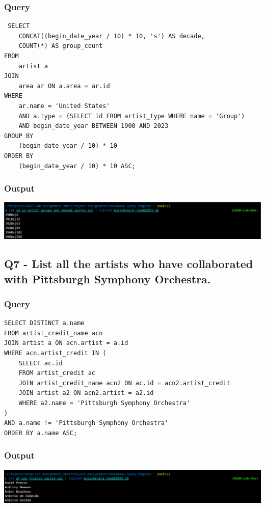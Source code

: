 \documentclass[11pt]{article}
\begin{document}
\subsubsection{Query}
\label{sec:org03e9635}
\begin{verbatim}
 SELECT
    CONCAT((begin_date_year / 10) * 10, 's') AS decade,
    COUNT(*) AS group_count
FROM
    artist a
JOIN
    area ar ON a.area = ar.id
WHERE
    ar.name = 'United States'
    AND a.type = (SELECT id FROM artist_type WHERE name = 'Group')
    AND begin_date_year BETWEEN 1900 AND 2023
GROUP BY
    (begin_date_year / 10) * 10
ORDER BY
    (begin_date_year / 10) * 10 ASC;
\end{verbatim}
\subsubsection{Output}
\label{sec:orge022a35}
\begin{center}
\includegraphics[width=.9\linewidth]{./images/Q6.png}
\end{center}
\subsection{Q7 - List all the artists who have collaborated with Pittsburgh Symphony Orchestra.}
\label{sec:org3d739ce}
\subsubsection{Query}
\label{sec:org730325a}
\begin{verbatim}
SELECT DISTINCT a.name
FROM artist_credit_name acn
JOIN artist a ON acn.artist = a.id
WHERE acn.artist_credit IN (
    SELECT ac.id
    FROM artist_credit ac
    JOIN artist_credit_name acn2 ON ac.id = acn2.artist_credit
    JOIN artist a2 ON acn2.artist = a2.id
    WHERE a2.name = 'Pittsburgh Symphony Orchestra'
)
AND a.name != 'Pittsburgh Symphony Orchestra'
ORDER BY a.name ASC;
\end{verbatim}
\subsubsection{Output}
\label{sec:org62d057d}
\begin{center}
\includegraphics[width=.9\linewidth]{./images/Q7.png}
\end{center}
\end{document}
